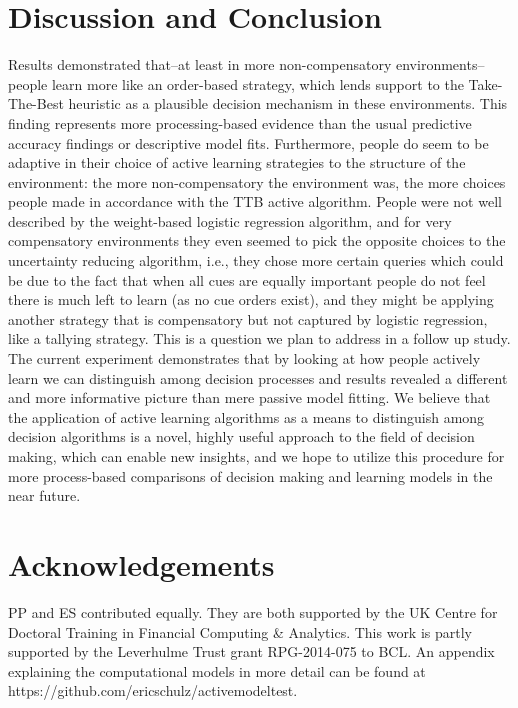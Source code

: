 \documentclass[10pt,letterpaper]{article}
\begin{document}
\section{Discussion and Conclusion}
Results demonstrated that--at least in more non-compensatory environments-- people learn more like an order-based strategy, which lends support to the Take-The-Best heuristic as a plausible decision mechanism in these environments. This finding represents more processing-based evidence than the usual predictive accuracy findings or descriptive model fits.  Furthermore, people do seem to be adaptive in their choice of active learning strategies to the structure of the environment: the more non-compensatory the environment was, the more choices people made in accordance with the TTB active algorithm. People were not well described by the weight-based logistic regression algorithm, and for very compensatory environments they even seemed to pick the opposite choices to the uncertainty reducing algorithm, i.e., they chose more certain queries which could be due to the fact that when all cues are equally important people do not feel there is much left to learn (as no cue orders exist), and they might be applying another strategy that is compensatory but not captured by logistic regression, like a tallying strategy. This is a question we plan to address in a follow up study. The current experiment demonstrates that by looking at how people actively learn we can distinguish among decision processes and results revealed a different and more informative picture than mere passive model fitting. We believe that the application of active learning algorithms as a means to distinguish among decision algorithms is a novel, highly useful approach to the field of decision making, which can enable new insights, and we hope to utilize this procedure for more process-based comparisons of decision making and learning models in the near future.

\section{Acknowledgements}
PP and ES contributed equally. They are both supported by the UK Centre for Doctoral Training in Financial Computing \& Analytics.  This work is partly supported by the Leverhulme Trust grant RPG-2014-075 to BCL. An appendix explaining the computational models in more detail can be found at https://github.com/ericschulz/activemodeltest.
\footnotesize


\end{document}
